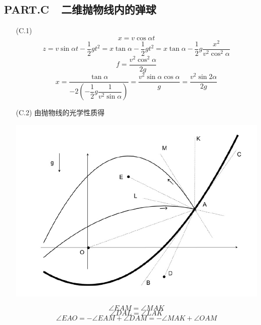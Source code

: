 \documentclass{article}
\begin{document}
\subsection*{PART.C\ \ 二维抛物线内的弹球}
\begin{itemize}
    \item[(C.1)]
    \begin{equation}x=v\cos\alpha t\end{equation}
    \begin{equation}z=v\sin\alpha t-\dfrac 12gt^2=x\tan\alpha-\dfrac 12gt^2=x\tan\alpha-\dfrac 12g\dfrac{x^2}{v^2\cos^2\alpha}\end{equation}
    \begin{equation}f=\frac{v^2\cos^2\alpha}{2g}\end{equation}
    \begin{equation}x=\dfrac{\tan\alpha}{-2(-\dfrac12g\dfrac1{v^2\sin\alpha})}=\dfrac{v^2\sin\alpha\cos\alpha}{g}=\frac{v^2\sin2\alpha}{2g}\end{equation}
    \item[(C.2)]由抛物线的光学性质得
    \begin{center}
        \includegraphics[scale=0.3]{img/0017.4.jpg}\par
    \end{center}
    \begin{equation}\angle EAM=\angle MAK\end{equation}
    \begin{equation}\angle DAL=\angle LAK\end{equation}
    \begin{equation}\angle EAO=-\angle EAM+\angle DAM=-\angle MAK+\angle OAM\end{equation}

\end{itemize}
\end{document}
